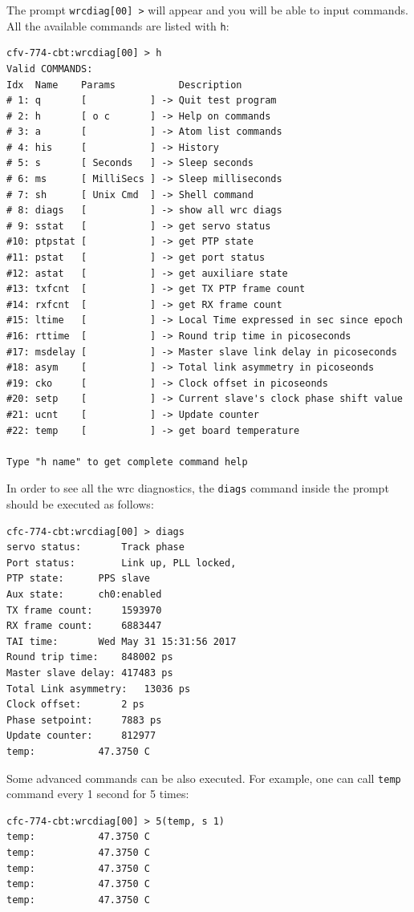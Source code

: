 \documentclass[a4paper, 12pt]{article}
\renewcommand{\_}{\underscore\allowbreak}
\begin{document}
The prompt \texttt{wrcdiag[00] >} will appear and you will be able to input commands.
All the available commands are listed with \texttt{h}:
\begin{lstlisting}[basicstyle=\scriptsize\ttfamily]
cfv-774-cbt:wrcdiag[00] > h
Valid COMMANDS:
Idx  Name    Params           Description
# 1: q       [           ] -> Quit test program
# 2: h       [ o c       ] -> Help on commands
# 3: a       [           ] -> Atom list commands
# 4: his     [           ] -> History
# 5: s       [ Seconds   ] -> Sleep seconds
# 6: ms      [ MilliSecs ] -> Sleep milliseconds
# 7: sh      [ Unix Cmd  ] -> Shell command
# 8: diags   [           ] -> show all wrc diags
# 9: sstat   [           ] -> get servo status
#10: ptpstat [           ] -> get PTP state
#11: pstat   [           ] -> get port status
#12: astat   [           ] -> get auxiliare state
#13: txfcnt  [           ] -> get TX PTP frame count
#14: rxfcnt  [           ] -> get RX frame count
#15: ltime   [           ] -> Local Time expressed in sec since epoch
#16: rttime  [           ] -> Round trip time in picoseconds
#17: msdelay [           ] -> Master slave link delay in picoseconds
#18: asym    [           ] -> Total link asymmetry in picoseonds
#19: cko     [           ] -> Clock offset in picoseonds
#20: setp    [           ] -> Current slave's clock phase shift value
#21: ucnt    [           ] -> Update counter
#22: temp    [           ] -> get board temperature

Type "h name" to get complete command help
\end{lstlisting}
In order to see all the wrc diagnostics, the \texttt{diags} command inside the prompt should
be executed as follows:
\begin{lstlisting}
cfc-774-cbt:wrcdiag[00] > diags
servo status:		Track phase
Port status:		Link up, PLL locked, 
PTP state:		PPS slave
Aux state:		ch0:enabled
TX frame count:		1593970
RX frame count:		6883447
TAI time:		Wed May 31 15:31:56 2017
Round trip time:	848002 ps
Master slave delay:	417483 ps
Total Link asymmetry:	13036 ps
Clock offset:		2 ps
Phase setpoint:		7883 ps
Update counter:		812977
temp:			47.3750 C
\end{lstlisting}
Some advanced commands can be also executed. For example, one can call
\texttt{temp} command every 1 second for 5 times:
\begin{lstlisting}
cfc-774-cbt:wrcdiag[00] > 5(temp, s 1)
temp:			47.3750 C
temp:			47.3750 C
temp:			47.3750 C
temp:			47.3750 C
temp:			47.3750 C
\end{lstlisting}
\end{document}
